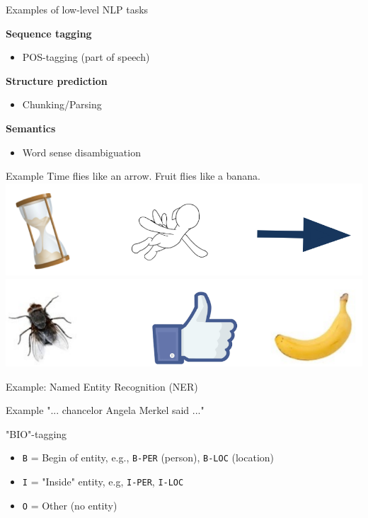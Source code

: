 \begin{frame}{Examples of low-level NLP tasks}

\textbf{Sequence tagging}

\begin{itemize}
	\item POS-tagging (part of speech)
\end{itemize}

\textbf{Structure prediction}

\begin{itemize}
	\item Chunking/Parsing
\end{itemize}

\textbf{Semantics}

\begin{itemize}
	\item Word sense disambiguation
\end{itemize}

	\begin{exampleblock}{Example}
		Time flies   like   an   arrow. \hfil Fruit   flies   like   a   banana. \\
		\includegraphics[width=0.3\linewidth]{figure/timeflies.png} \hspace{5.5em}
		\includegraphics[width=0.3\linewidth]{figure/friutflies.png}
	\end{exampleblock}
	
\vfill

\end{frame}


\begin{frame}{Example: Named Entity Recognition (NER)}

\vfill

\begin{exampleblock}{Example}
"... chancelor Angela Merkel said ..."
\end{exampleblock}

"BIO"-tagging
\begin{itemize}
	\item \texttt{B} = Begin of entity, e.g., \texttt{B-PER} (person), \texttt{B-LOC} (location)
	\item \texttt{I} = "Inside" entity, e.g, \texttt{I-PER}, \texttt{I-LOC}
	\item \texttt{O} = Other (no entity)
\end{itemize}
	
\vfill

\end{frame}

